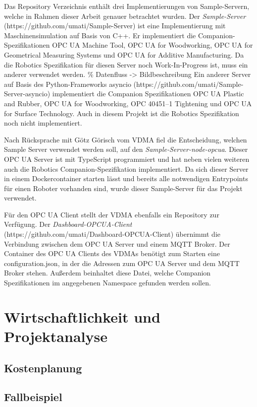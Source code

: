 \documentclass[a4paper, 12pt, oneside, toc=listofnumbered, bibliography=totoc]{scrbook}
\begin{document}
		Das Repository Verzeichnis enthält drei Implementierungen von Sample-Servern, welche in Rahmen dieser Arbeit genauer betrachtet wurden. Der \textit{Sample-Server} \linebreak (https://github.com/umati/Sample-Server) ist eine Implementierung mit Maschinensimulation auf Basis von C++. Er implementiert die Companion-Spezifikationen OPC UA Machine Tool, OPC UA for Woodworking, OPC UA for Geometrical Measuring Systems und OPC UA for Additive Manufacturing. Da die Robotics Spezifikation für diesen Server noch Work-In-Progress ist, muss ein anderer verwendet werden.
		\% Datenfluss -> Bildbeschreibung
		Ein anderer Server auf Basis des Python-Frameworks asyncio (https://github.com/umati/Sample-Server-asyncio) implementiert die Companion Spezifikationen OPC UA Plastic and Rubber, OPC UA for Woodworking, OPC 40451–1 Tightening und OPC UA for Surface Technology. Auch in diesem Projekt ist die Robotics Spezifikation noch nicht implementiert.
		
		Nach Rücksprache mit Götz Görisch vom VDMA fiel die Entscheidung, welchen Sample Server verwendet werden soll, auf den \textit{Sample-Server-node-opcua}. Dieser OPC UA Server ist mit TypeScript programmiert und hat neben vielen weiteren auch die Robotics Companion-Spezifikation implementiert. Da sich dieser Server in einem Dockercontainer starten lässt und bereits alle notwendigen Entrypoints für einen Roboter vorhanden sind, wurde dieser Sample-Server für das Projekt verwendet.
		
		Für den OPC UA Client stellt der VDMA ebenfalls ein Repository zur Verfügung. Der \textit{Dashboard-OPCUA-Client} (https://github.com/umati/Dashboard-OPCUA-Client) übernimmt die Verbindung zwischen dem OPC UA Server und einem MQTT Broker. Der Container des OPC UA Clients des VDMAs benötigt zum Starten eine configuration.json, in der die Adressen zum OPC UA Server und dem MQTT Broker stehen. Außerdem beinhaltet diese Datei, welche Companion Spezifikationen im angegebenen Namespace gefunden werden sollen. 
		
	\section{Wirtschaftlichkeit und Projektanalyse}
	
		\subsection{Kostenplanung}
		
		\subsection{Fallbeispiel}
	
\end{document}
